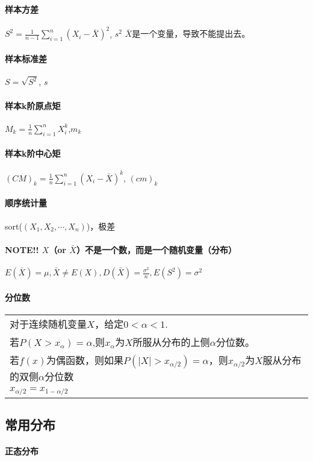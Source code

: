 \documentclass[a4paper]{ctexart}
\begin{document}
\paragraph{样本方差} $S^2=\frac{1}{n-1}\sum_{i=1}^n (X_i-\bar X)^2$, $s^2$ {\color{blue} $\bar X$是一个变量，导致不能提出去。}\\
\paragraph{样本标准差} $S=\sqrt{S^2}$, $s$
\paragraph{样本k阶原点矩} $M_k=\frac{1}{n} \sum_{i=1}^n X_i^k$,$m_k$
\paragraph{样本k阶中心矩} $(CM)_k=\frac{1}{n}\sum_{i=1}^n (X_i-\bar X)^k$, $(cm)_k$
\paragraph{顺序统计量} sort($(X_1,X_2,\cdots, X_n)$)，极差
\paragraph{\color{blue}NOTE!! $X$（or $\bar X$）不是一个数，而是一个随机变量（分布）}
$E(\bar X)=\mu, \bar X\neq E(X), D(\bar X)=\frac{\sigma^2}{n}, E(S^2)=\sigma^2$
\paragraph{分位数}
\begin{tabular}{l}
    对于连续随机变量$X$，给定$0<\alpha<1$.                                                                            \\
    若$P(X>x_\alpha)=\alpha$,则$x_\alpha$为$X$所服从分布的上侧$\alpha$分位数。                                        \\
    若$f(x)$为偶函数，则如果$P(\vert X\vert> x_{\alpha/2})=\alpha$，则$x_{\alpha/2}$为$X$服从分布的双侧$\alpha$分位数 \\
    $x_{\alpha/2}=x_{1-\alpha/2}$
\end{tabular}
\subsection{常用分布}
\paragraph{正态分布}
\end{document}

